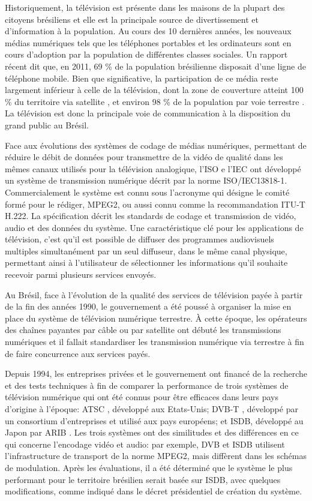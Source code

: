\documentclass[12pt,a4paper]{article}
\begin{document}
Historiquement, la télévision est présente dans les maisons de la plupart des citoyens brésiliens et elle est la principale source de divertissement et d'information à la population. Au cours des 10 dernières années, les nouveaux médias numériques tels que les téléphones portables et les ordinateurs sont en cours d'adoption par la population de différentes classes sociales. Un rapport récent \cite{pnad2011} dit que, en 2011, 69 \% de la population brésilienne disposait d'une ligne de téléphone mobile. Bien que significative, la participation de ce média reste largement inférieur à celle de la télévision, dont la zone de couverture atteint 100 \% du territoire via satellite \cite{StarOne}, et environ 98 \% de la population par voie terrestre \cite{globo}. La télévision est donc la principale voie de communication à la disposition du grand public au Brésil.

Face aux évolutions des systèmes de codage de médias numériques, permettant de réduire le débit de données pour transmettre de la vidéo de qualité dans les mêmes canaux utilisés pour la télévision analogique, l'ISO e l'IEC ont développé un système de transmission numérique décrit par la norme ISO/IEC13818-1. Commercialement le système est connu sous l'acronyme qui désigne le comité formé pour le rédiger, MPEG2, ou aussi connu comme la recommandation ITU-T H.222. La spécification décrit les standards de codage et transmission de vidéo, audio et des données du système. Une caractéristique clé pour les applications de télévision, c'est qu'il est possible de diffuser des programmes audiovisuels multiples simultanément par un seul diffuseur, dans le même canal physique, permettant ainsi à l'utilisateur de sélectionner les informations qu'il souhaite recevoir parmi plusieurs services envoyés.

Au Brésil, face à l'évolution de la qualité des services de télévision payée à partir de la fin des années 1990, le gouvernement a été poussé à organiser la mise en place du système de télévision numérique terrestre. À cette époque, les opérateurs des chaînes payantes par câble ou par satellite ont débuté les transmissions numériques et il fallait standardiser les transmission numérique via terrestre à fin de faire concurrence aux services payés.

Depuis 1994, les entreprises privées et le gouvernement ont financé de la recherche et des tests techniques à fin de comparer la performance de trois systèmes de télévision numérique qui ont été connus pour être efficaces dans leurs pays d'origine à l'époque: ATSC \cite{ATSC}, développé aux Etats-Unis; DVB-T \cite{DVB}, développé par un consortium d'entreprises et utilisé aux pays européens; et ISDB, développé au Japon par ARIB \cite{ARIB}. Les trois systèmes ont des similitudes et des différences en ce qui concerne l'encodage vidéo et audio: par exemple, DVB et ISDB utilisent l'infrastructure de transport de la norme MPEG2, mais diffèrent dans les schémas de modulation. Après les évaluations, il a été déterminé que le système le plus performant pour le territoire brésilien serait basée sur ISDB, avec quelques modifications, comme indiqué dans le décret présidentiel de création du système\cite{decreto8061}.
\end{document}
